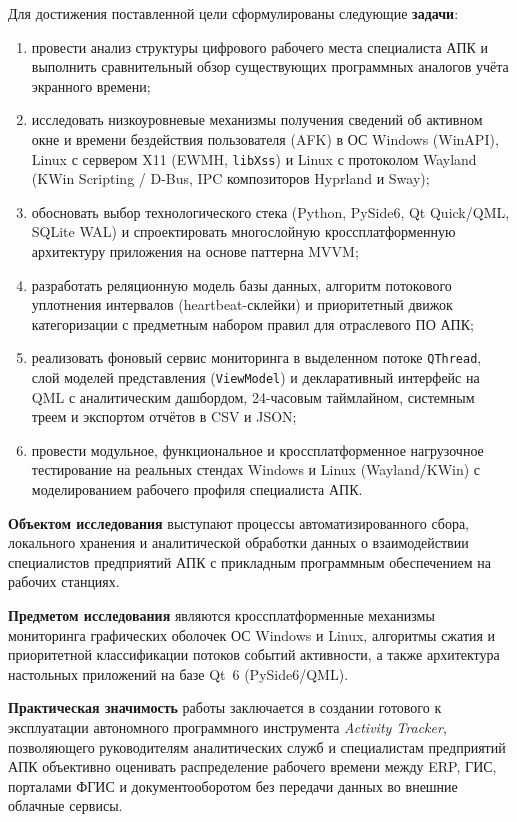 \documentclass{timcw}
\begin{document}
Для достижения поставленной цели сформулированы следующие \textbf{задачи}:
\begin{enumerate}
  \item провести анализ структуры цифрового рабочего места специалиста АПК и выполнить сравнительный обзор существующих программных аналогов учёта экранного времени;
  \item исследовать низкоуровневые механизмы получения сведений об активном окне и времени бездействия пользователя (AFK) в ОС Windows (WinAPI), Linux с сервером X11 (EWMH, \texttt{libXss}) и Linux с протоколом Wayland (KWin Scripting / D-Bus, IPC композиторов Hyprland и Sway);
  \item обосновать выбор технологического стека (Python, PySide6, Qt Quick/QML, SQLite WAL) и спроектировать многослойную кроссплатформенную архитектуру приложения на основе паттерна MVVM;
  \item разработать реляционную модель базы данных, алгоритм потокового уплотнения интервалов (heartbeat-склейки) и приоритетный движок категоризации с предметным набором правил для отраслевого ПО АПК;
  \item реализовать фоновый сервис мониторинга в выделенном потоке \texttt{QThread}, слой моделей представления (\texttt{ViewModel}) и декларативный интерфейс на QML с аналитическим дашбордом, 24-часовым таймлайном, системным треем и экспортом отчётов в CSV и JSON;
  \item провести модульное, функциональное и кроссплатформенное нагрузочное тестирование на реальных стендах Windows и Linux (Wayland/KWin) с моделированием рабочего профиля специалиста АПК.
\end{enumerate}

\textbf{Объектом исследования} выступают процессы автоматизированного сбора, локального хранения и аналитической обработки данных о взаимодействии специалистов предприятий АПК с прикладным программным обеспечением на рабочих станциях.

\textbf{Предметом исследования} являются кроссплатформенные механизмы мониторинга графических оболочек ОС Windows и Linux, алгоритмы сжатия и приоритетной классификации потоков событий активности, а также архитектура настольных приложений на базе Qt~6 (PySide6/QML).

\textbf{Практическая значимость} работы заключается в создании готового к эксплуатации автономного программного инструмента \emph{Activity Tracker}, позволяющего руководителям аналитических служб и специалистам предприятий АПК объективно оценивать распределение рабочего времени между ERP, ГИС, порталами ФГИС и документооборотом без передачи данных во внешние облачные сервисы.
\end{document}
